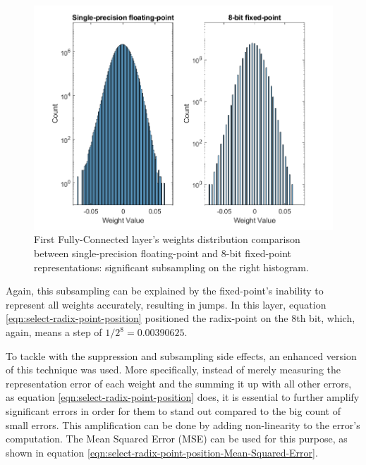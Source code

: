 \begin{figure} [H]
	\centering
	\includegraphics[scale=0.9]{Images/Weights-distributions/original-vs-fixed8/weight-distribution-FC1.png}
	\decoRule
	\caption[First Fully-Connected layer's weights distribution comparison between single-precision floating-point and 8-bit fixed-point representations]{First Fully-Connected layer's weights distribution comparison between single-precision floating-point and 8-bit fixed-point representations: significant subsampling on the right histogram.}
	\label{fig:weight-distribution-comparison-FC1}
\end{figure}

Again, this subsampling can be explained by the fixed-point's inability to represent all weights accurately, resulting in jumps. In this layer, equation \ref{eqn:select-radix-point-position} positioned the radix-point on the 8th bit, which, again, means a step of $1/2^8 = 0.00390625$.

To tackle with the suppression and subsampling side effects, an enhanced version of this technique was used. More specifically, instead of merely measuring the representation error of each weight and the summing it up with all other errors, as equation \ref{eqn:select-radix-point-position} does, it is essential to further amplify significant errors in order for them to stand out compared to the big count of small errors. This amplification can be done by adding non-linearity to the error's computation. The Mean Squared Error (MSE) can be used for this purpose, as shown in equation \ref{eqn:select-radix-point-position-Mean-Squared-Error}.

